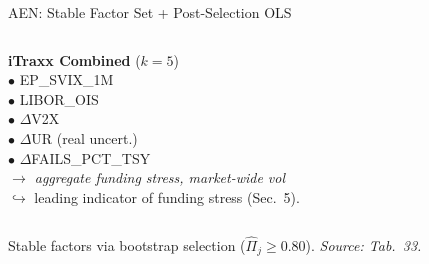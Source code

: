 \documentclass[aspectratio=169,11pt]{beamer}
\begin{document}
\begin{frame}[t]{AEN: Stable Factor Set + Post-Selection OLS}
\begin{columns}[t]
\textbf{iTraxx Combined} ($k=5$)\\[2pt]
\scriptsize
$\bullet$ EP\_SVIX\_1M \\
$\bullet$ LIBOR\_OIS \\
$\bullet$ $\Delta$V2X \\
$\bullet$ $\Delta$UR (real uncert.) \\
$\bullet$ $\Delta$FAILS\_PCT\_TSY \\[6pt]
\textcolor{myblue}{\textit{$\rightarrow$ aggregate funding stress, market-wide vol}}\\[4pt]
\textcolor{myred}{\scriptsize $\hookrightarrow$ leading indicator of funding stress (Sec.\ 5).}
\end{columns}

\vspace{0.20cm}

\centering
{\scriptsize Stable factors via bootstrap selection ($\hat\Pi_j \geq 0.80$). \emph{Source: Tab.\ 33.}}

\end{frame}
\end{document}
